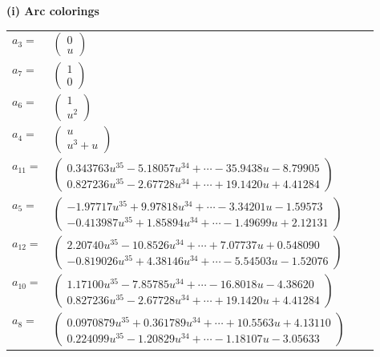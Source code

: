 \documentclass[1p]{elsarticle_modified}
\theoremstyle{definition}
\begin{document}
\flushleft \textbf{(i) Arc colorings}\\
\begin{tabular}{m{7pt} m{180pt} m{7pt} m{180pt} }
\flushright $a_{3}=$&$\begin{pmatrix}0\\u\end{pmatrix}$ \\
\flushright $a_{7}=$&$\begin{pmatrix}1\\0\end{pmatrix}$ \\
\flushright $a_{6}=$&$\begin{pmatrix}1\\u^2\end{pmatrix}$ \\
\flushright $a_{4}=$&$\begin{pmatrix}u\\u^3+u\end{pmatrix}$ \\
\flushright $a_{11}=$&$\begin{pmatrix}0.343763 u^{35}-5.18057 u^{34}+\cdots-35.9438 u-8.79905\\0.827236 u^{35}-2.67728 u^{34}+\cdots+19.1420 u+4.41284\end{pmatrix}$ \\
\flushright $a_{5}=$&$\begin{pmatrix}-1.97717 u^{35}+9.97818 u^{34}+\cdots-3.34201 u-1.59573\\-0.413987 u^{35}+1.85894 u^{34}+\cdots-1.49699 u+2.12131\end{pmatrix}$ \\
\flushright $a_{12}=$&$\begin{pmatrix}2.20740 u^{35}-10.8526 u^{34}+\cdots+7.07737 u+0.548090\\-0.819026 u^{35}+4.38146 u^{34}+\cdots-5.54503 u-1.52076\end{pmatrix}$ \\
\flushright $a_{10}=$&$\begin{pmatrix}1.17100 u^{35}-7.85785 u^{34}+\cdots-16.8018 u-4.38620\\0.827236 u^{35}-2.67728 u^{34}+\cdots+19.1420 u+4.41284\end{pmatrix}$ \\
\flushright $a_{8}=$&$\begin{pmatrix}0.0970879 u^{35}+0.361789 u^{34}+\cdots+10.5563 u+4.13110\\0.224099 u^{35}-1.20829 u^{34}+\cdots-1.18107 u-3.05633\end{pmatrix}$ \\

\end{tabular}
\end{document}
